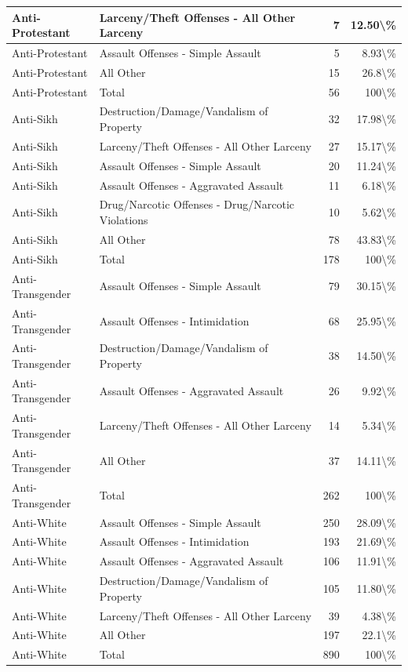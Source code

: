 \documentclass[
]{krantz}
\begin{document}
\begin{longtable}[t]{l|l|r|r}
\hline
Anti-Protestant & Larceny/Theft Offenses - All Other Larceny & 7 & 12.50\textbackslash{}\%\\
\hline
Anti-Protestant & Assault Offenses - Simple Assault & 5 & 8.93\textbackslash{}\%\\
\hline
Anti-Protestant & All Other & 15 & 26.8\textbackslash{}\%\\
\hline
Anti-Protestant & Total & 56 & 100\textbackslash{}\%\\
\hline
Anti-Sikh & Destruction/Damage/Vandalism of Property & 32 & 17.98\textbackslash{}\%\\
\hline
Anti-Sikh & Larceny/Theft Offenses - All Other Larceny & 27 & 15.17\textbackslash{}\%\\
\hline
Anti-Sikh & Assault Offenses - Simple Assault & 20 & 11.24\textbackslash{}\%\\
\hline
Anti-Sikh & Assault Offenses - Aggravated Assault & 11 & 6.18\textbackslash{}\%\\
\hline
Anti-Sikh & Drug/Narcotic Offenses - Drug/Narcotic Violations & 10 & 5.62\textbackslash{}\%\\
\hline
Anti-Sikh & All Other & 78 & 43.83\textbackslash{}\%\\
\hline
Anti-Sikh & Total & 178 & 100\textbackslash{}\%\\
\hline
Anti-Transgender & Assault Offenses - Simple Assault & 79 & 30.15\textbackslash{}\%\\
\hline
Anti-Transgender & Assault Offenses - Intimidation & 68 & 25.95\textbackslash{}\%\\
\hline
Anti-Transgender & Destruction/Damage/Vandalism of Property & 38 & 14.50\textbackslash{}\%\\
\hline
Anti-Transgender & Assault Offenses - Aggravated Assault & 26 & 9.92\textbackslash{}\%\\
\hline
Anti-Transgender & Larceny/Theft Offenses - All Other Larceny & 14 & 5.34\textbackslash{}\%\\
\hline
Anti-Transgender & All Other & 37 & 14.11\textbackslash{}\%\\
\hline
Anti-Transgender & Total & 262 & 100\textbackslash{}\%\\
\hline
Anti-White & Assault Offenses - Simple Assault & 250 & 28.09\textbackslash{}\%\\
\hline
Anti-White & Assault Offenses - Intimidation & 193 & 21.69\textbackslash{}\%\\
\hline
Anti-White & Assault Offenses - Aggravated Assault & 106 & 11.91\textbackslash{}\%\\
\hline
Anti-White & Destruction/Damage/Vandalism of Property & 105 & 11.80\textbackslash{}\%\\
\hline
Anti-White & Larceny/Theft Offenses - All Other Larceny & 39 & 4.38\textbackslash{}\%\\
\hline
Anti-White & All Other & 197 & 22.1\textbackslash{}\%\\
\hline
Anti-White & Total & 890 & 100\textbackslash{}\%\\
\hline
\end{longtable}
\end{document}
